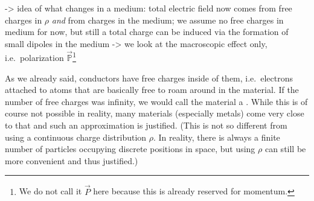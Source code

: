 \documentclass[../class_mech_main.tex]{subfiles}
\begin{document}
-> idea of what changes in a medium: total electric field now comes from free charges in $\rho$ \emph{and} from charges in the medium; we assume no free charges in medium for now, but still a total charge can be induced via the formation of small dipoles in the medium -> we look at the macroscopic effect only, i.e.~polarization $\vec{\mathbb{P}}$\footnote{We do not call it $\vec{P}$ here because this is already reserved for momentum.}


As we already said, conductors have free charges inside of them, i.e.~electrons attached to atoms that are basically free to roam around in the material. If the number of free charges was infinity, we would call the material a . While this is of course not possible in reality, many materials (especially metals) come very close to that and such an approximation is justified. (This is not so different from using a continuous charge distribution $\rho$. In reality, there is always a finite number of particles occupying discrete positions in space, but using $\rho$ can still be more convenient and thus justified.)
\end{document}
